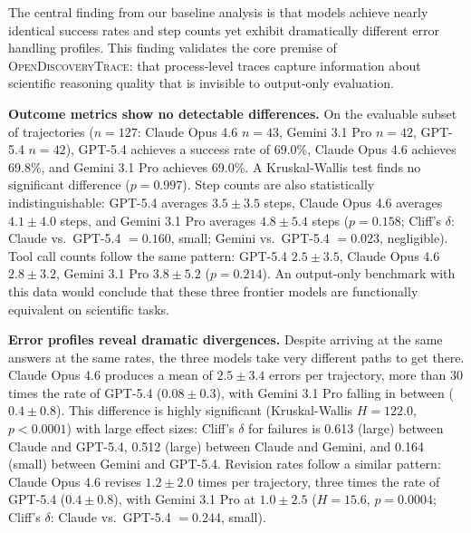 \documentclass{article}
\newcommand{\dataset}{\textsc{OpenDiscoveryTrace}\xspace}
\begin{document}
The central finding from our baseline analysis is that models achieve nearly identical success rates and step counts yet exhibit dramatically different error handling profiles. This finding validates the core premise of \dataset: that process-level traces capture information about scientific reasoning quality that is invisible to output-only evaluation.

\textbf{Outcome metrics show no detectable differences.} On the evaluable subset of trajectories ($n=127$: Claude Opus 4.6 $n=43$, Gemini 3.1 Pro $n=42$, GPT-5.4 $n=42$), GPT-5.4 achieves a success rate of 69.0\%, Claude Opus 4.6 achieves 69.8\%, and Gemini 3.1 Pro achieves 69.0\%. A Kruskal-Wallis test finds no significant difference ($p=0.997$). Step counts are also statistically indistinguishable: GPT-5.4 averages $3.5 \pm 3.5$ steps, Claude Opus 4.6 averages $4.1 \pm 4.0$ steps, and Gemini 3.1 Pro averages $4.8 \pm 5.4$ steps ($p=0.158$; Cliff's $\delta$: Claude vs.\ GPT-5.4 $= 0.160$, small; Gemini vs.\ GPT-5.4 $= 0.023$, negligible). Tool call counts follow the same pattern: GPT-5.4 $2.5 \pm 3.5$, Claude Opus 4.6 $2.8 \pm 3.2$, Gemini 3.1 Pro $3.8 \pm 5.2$ ($p=0.214$). An output-only benchmark with this data would conclude that these three frontier models are functionally equivalent on scientific tasks.

\textbf{Error profiles reveal dramatic divergences.} Despite arriving at the same answers at the same rates, the three models take very different paths to get there. Claude Opus 4.6 produces a mean of $2.5 \pm 3.4$ errors per trajectory, more than 30 times the rate of GPT-5.4 ($0.08 \pm 0.3$), with Gemini 3.1 Pro falling in between ($0.4 \pm 0.8$). This difference is highly significant (Kruskal-Wallis $H=122.0$, $p<0.0001$) with large effect sizes: Cliff's $\delta$ for failures is 0.613 (large) between Claude and GPT-5.4, 0.512 (large) between Claude and Gemini, and 0.164 (small) between Gemini and GPT-5.4. Revision rates follow a similar pattern: Claude Opus 4.6 revises $1.2 \pm 2.0$ times per trajectory, three times the rate of GPT-5.4 ($0.4 \pm 0.8$), with Gemini 3.1 Pro at $1.0 \pm 2.5$ ($H=15.6$, $p=0.0004$; Cliff's $\delta$: Claude vs.\ GPT-5.4 $= 0.244$, small).
\end{document}
